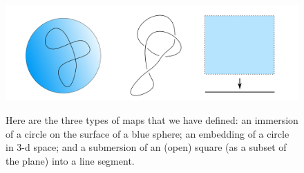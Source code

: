 \documentclass[12pt]{article}
\theoremstyle{definition}
\numberwithin{equation}{section}
\begin{document}
\begin{figure}[h]
    \centering
    \includegraphics[width=1\textwidth]{reu_figures/immersion_embedding_submersion.png}
    \label{fig:immersion_embedding_submersion}
    \caption{Here are the three types of maps that we have defined: an immersion of a circle on the surface of a blue sphere; an embedding of a circle in 3-d space; and a submersion of an (open) square (as a subset of the plane) into a line segment.}
\end{figure}
\end{document}
